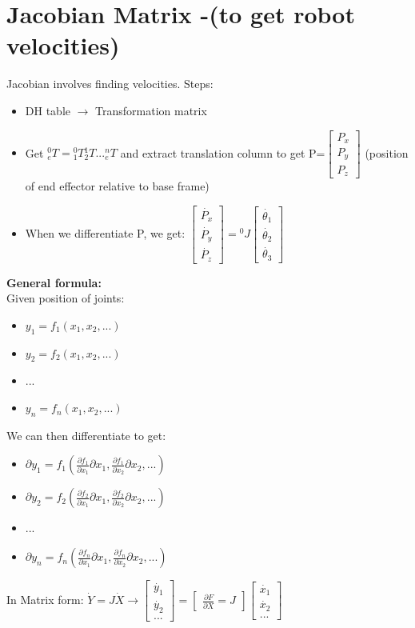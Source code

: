\documentclass{article}
\begin{document}
\section{Jacobian Matrix -(to get robot velocities)}
Jacobian involves finding velocities. Steps:
\begin{itemize}
    \item DH table $\rightarrow$ Transformation matrix
    \item Get ${}^0_eT={}^0_1T {}^1_2T ... {}^n_eT$ and extract translation column to get P=$\begin{bmatrix}
        P_x\\
        P_y\\
        P_z
    \end{bmatrix}$ (position of end effector relative to base frame)
    \item When we differentiate P, we get: $\begin{bmatrix}
        \dot{P_x}\\
        \dot{P_y}\\
        \dot{P_z}
    \end{bmatrix}= {}^0J \begin{bmatrix}
        \dot{\theta_1} \\
        \dot{\theta_2} \\
        \dot{\theta_3}
    \end{bmatrix}$
\end{itemize}
\textbf{General formula:}\\
Given position of joints:
\begin{itemize}
    \item $y_1=f_1(x_1,x_2,...)$
    \item $y_2=f_2(x_1,x_2,...)$
    \item ...
    \item $y_n=f_n(x_1,x_2,...)$
\end{itemize}
We can then differentiate to get:
\begin{itemize}
    \item $\partial y_1=f_1(\frac{\partial f_1}{\partial x_1}\partial x_1,\frac{\partial f_1}{\partial x_2}\partial x_2,...)$
    \item $\partial y_2=f_2(\frac{\partial f_2}{\partial x_1}\partial x_1,\frac{\partial f_2}{\partial x_2}\partial x_2,...)$
    \item ...
    \item $\partial y_n=f_n(\frac{\partial f_n}{\partial x_1}\partial x_1,\frac{\partial f_n}{\partial x_2}\partial x_2,...)$
\end{itemize}
In Matrix form:
$\dot{Y}=J\dot{X} \rightarrow \begin{bmatrix}
    \dot{y_1}\\
    \dot{y_2}\\
    ...
\end{bmatrix}=
\begin{bmatrix}
    \frac{\partial F}{\partial X} = J 
\end{bmatrix}\begin{bmatrix}
    \dot{x_1}\\
    \dot{x_2}\\
    ...
\end{bmatrix}$
\end{document}
